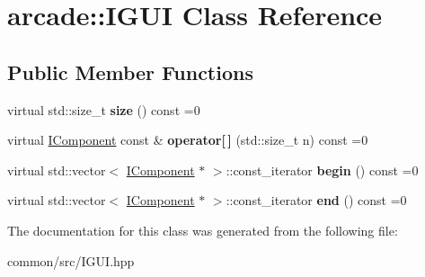 \hypertarget{classarcade_1_1IGUI}{}\section{arcade\+:\+:I\+G\+UI Class Reference}
\label{classarcade_1_1IGUI}
\subsection*{Public Member Functions}
\begin{DoxyCompactItemize}
\item 
\mbox{\label{classarcade_1_1IGUI_aee8a5c4e167a3b73696b139d637b7ca7}} 
virtual std\+::size\+\_\+t {\bfseries size} () const =0
\item 
\mbox{\label{classarcade_1_1IGUI_a429533730e71e2c76dceb5c368c13fae}} 
virtual \hyperlink{classarcade_1_1IComponent}{I\+Component} const  \& {\bfseries operator\mbox{[}$\,$\mbox{]}} (std\+::size\+\_\+t n) const =0
\item 
\mbox{\label{classarcade_1_1IGUI_a0d81a108dc38ec9157fff8d012806045}} 
virtual std\+::vector$<$ \hyperlink{classarcade_1_1IComponent}{I\+Component} $\ast$ $>$\+::const\+\_\+iterator {\bfseries begin} () const =0
\item 
\mbox{\label{classarcade_1_1IGUI_a07314d37b232ab0608773173dc2e80d5}} 
virtual std\+::vector$<$ \hyperlink{classarcade_1_1IComponent}{I\+Component} $\ast$ $>$\+::const\+\_\+iterator {\bfseries end} () const =0
\end{DoxyCompactItemize}


The documentation for this class was generated from the following file\+:\begin{DoxyCompactItemize}
\item 
common/src/I\+G\+U\+I.\+hpp\end{DoxyCompactItemize}
